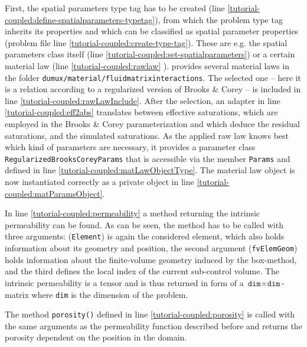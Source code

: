 \begin{lst}\label{tutorial-coupled:spatialparametersfile} \mbox{}

\end{lst}

First, the spatial parameters type tag has to be created (line \ref{tutorial-coupled:define-spatialparameters-typetag}), 
from which the problem type tag inherits its properties and which can be classified as spatial parameter properties 
(problem file line \ref{tutorial-coupled:create-type-tag}). These are e.g. the spatial parameters class itself (line \ref{tutorial-coupled:set-spatialparameters}) 
or a certain material law  (line \ref{tutorial-coupled:rawlaw} \label{tutorial-coupled:materialLaw}). 
\Dumux provides several material laws in the folder 
\verb+dumux/material/fluidmatrixinteractions+.
The selected one -- here it is a relation according to a regularized version of Brooks \& Corey --  is included
in line \ref{tutorial-coupled:rawLawInclude}. After the selection,
an adapter in line \ref{tutorial-coupled:eff2abs} translates between effective saturations, which are employed in the Brooks \& Corey parameterization 
and which deduce the residual saturations, and the simulated saturations. 
As the applied raw law knows best which kind of parameters are necessary,
it provides a parameter class \texttt{RegularizedBrooksCoreyParams} that is
accessible via the member \texttt{Params} and defined in line 
\ref{tutorial-coupled:matLawObjectType}. The material law object 
is now instantiated correctly as a private object
in line \ref{tutorial-coupled:matParamsObject}.

In line \ref{tutorial-coupled:permeability} a method returning the
intrinsic permeability can be found. As can be seen, the method has
to be called with three arguments:
(\texttt{Element}) is again the considered element, which also holds information
about its geometry and position, the second argument
(\texttt{fvElemGeom}) holds information about the finite-volume geometry induced
by the box-method, and the third defines the local index of the current sub-control 
volume. The intrinsic permeability is a tensor and is thus returned in form of
a $\texttt{dim} \times \texttt{dim}$-matrix where \texttt{dim} is the dimension 
of the problem. 

The method \texttt{porosity()} defined in line
\ref{tutorial-coupled:porosity} is called with the same arguments as
the permeability function described before and returns the porosity
dependent on the position in the domain.

